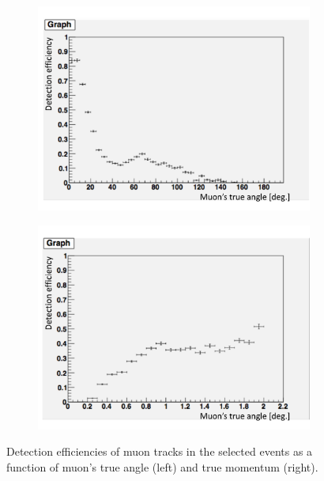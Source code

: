 \begin{figure}[tbh]
  \begin{center}
   \begin{subfigure}{0.48\textwidth}
     \includegraphics[width=\linewidth]{fig/eff_muon_angle_neutrino.pdf}
    \end{subfigure}
  \begin{subfigure}{0.48\textwidth}
      \includegraphics[width=\linewidth]{fig/eff_muon_momentum_neutrino.pdf}
    \end{subfigure}    
    \end{center}
  \caption{
Detection efficiencies of muon tracks in the selected events as a function of muon's true angle (left) and true momentum (right).
}
\label{fig:eff_muon_angle_momentum_neutrino}
\end{figure}

